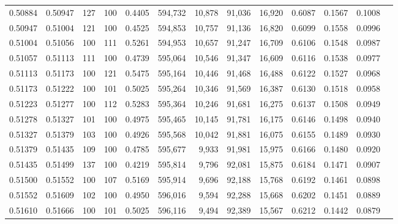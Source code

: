 \begin{tabular}{rrrrrrrrrrrrr}
0.50884 & 0.50947 &    127 & 100 &                                     0.4405 & 594,732 &  10,878 &  91,036 &  16,920 & 0.6087 & 0.1567 & 0.1008 \\
0.50947 & 0.51004 &    121 & 100 &                                     0.4525 & 594,853 &  10,757 &  91,136 &  16,820 & 0.6099 & 0.1558 & 0.0996 \\
0.51004 & 0.51056 &    100 & 111 &                                     0.5261 & 594,953 &  10,657 &  91,247 &  16,709 & 0.6106 & 0.1548 & 0.0987 \\
0.51057 & 0.51113 &    111 & 100 &                                     0.4739 & 595,064 &  10,546 &  91,347 &  16,609 & 0.6116 & 0.1538 & 0.0977 \\
0.51113 & 0.51173 &    100 & 121 &                                     0.5475 & 595,164 &  10,446 &  91,468 &  16,488 & 0.6122 & 0.1527 & 0.0968 \\
0.51173 & 0.51222 &    100 & 101 &                                     0.5025 & 595,264 &  10,346 &  91,569 &  16,387 & 0.6130 & 0.1518 & 0.0958 \\
0.51223 & 0.51277 &    100 & 112 &                                     0.5283 & 595,364 &  10,246 &  91,681 &  16,275 & 0.6137 & 0.1508 & 0.0949 \\
0.51278 & 0.51327 &    101 & 100 &                                     0.4975 & 595,465 &  10,145 &  91,781 &  16,175 & 0.6146 & 0.1498 & 0.0940 \\
0.51327 & 0.51379 &    103 & 100 &                                     0.4926 & 595,568 &  10,042 &  91,881 &  16,075 & 0.6155 & 0.1489 & 0.0930 \\
0.51379 & 0.51435 &    109 & 100 &                                     0.4785 & 595,677 &   9,933 &  91,981 &  15,975 & 0.6166 & 0.1480 & 0.0920 \\
0.51435 & 0.51499 &    137 & 100 &                                     0.4219 & 595,814 &   9,796 &  92,081 &  15,875 & 0.6184 & 0.1471 & 0.0907 \\
0.51500 & 0.51552 &    100 & 107 &                                     0.5169 & 595,914 &   9,696 &  92,188 &  15,768 & 0.6192 & 0.1461 & 0.0898 \\
0.51552 & 0.51609 &    102 & 100 &                                     0.4950 & 596,016 &   9,594 &  92,288 &  15,668 & 0.6202 & 0.1451 & 0.0889 \\
0.51610 & 0.51666 &    100 & 101 &                                     0.5025 & 596,116 &   9,494 &  92,389 &  15,567 & 0.6212 & 0.1442 & 0.0879 \\

\end{tabular}
